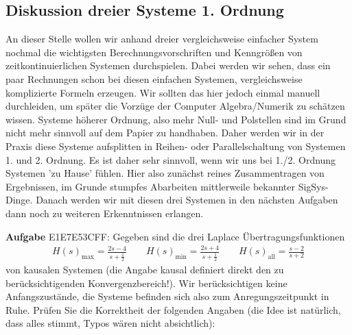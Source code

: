 \newpage
\subsection{Diskussion dreier Systeme 1. Ordnung}
\label{sec:E1E7E53CFF}
\begin{Ziel}
An dieser Stelle wollen wir anhand dreier vergleichsweise einfacher System
nochmal die wichtigsten Berechnungsvorschriften und Kenngrößen von
zeitkontinuierlichen Systemen durchspielen.
Dabei werden wir sehen, dass ein paar Rechnungen schon bei diesen einfachen
Systemen, vergleichsweise komplizierte Formeln erzeugen.
Wir sollten das hier jedoch einmal manuell durchleiden, um später die Vorzüge der
Computer Algebra/Numerik zu schätzen wissen. Systeme höherer Ordnung, also mehr Null-
und Polstellen sind im Grund nicht mehr sinnvoll auf dem Papier zu handhaben.
Daher werden wir in der Praxis diese Systeme aufsplitten in Reihen- oder
Parallelschaltung von Systemen 1. und 2. Ordnung. Es ist daher sehr sinnvoll,
wenn wir uns bei 1./2. Ordnung Systemen 'zu Hause' fühlen.
Hier also zunächst reines Zusammentragen von Ergebnissen, im Grunde stumpfes
Abarbeiten mittlerweile bekannter SigSys-Dinge. Danach werden wir mit diesen
drei Systemen in den nächsten Aufgaben dann noch zu weiteren Erkenntnissen
erlangen.
\end{Ziel}
\textbf{Aufgabe} {\tiny E1E7E53CFF}: Gegeben sind die drei Laplace
Übertragungsfunktionen
\begin{align}
H(s)_\mathrm{max} = \frac{2 s-4}{s+\frac{1}{2}}\qquad
H(s)_\mathrm{min} = \frac{2 s+4}{s+\frac{1}{2}}\qquad
H(s)_\mathrm{all} = \frac{s-2}{s+2}
\end{align}
von kausalen Systemen (die Angabe kausal definiert direkt den zu berücksichtigenden
Konvergenzbereich!).
Wir berücksichtigen keine Anfangszustände, die Systeme
befinden sich also zum Anregungszeitpunkt in Ruhe.
%
Prüfen Sie die Korrektheit der folgenden Angaben (die Idee ist natürlich,
dass alles stimmt, Typos wären nicht absichtlich):
